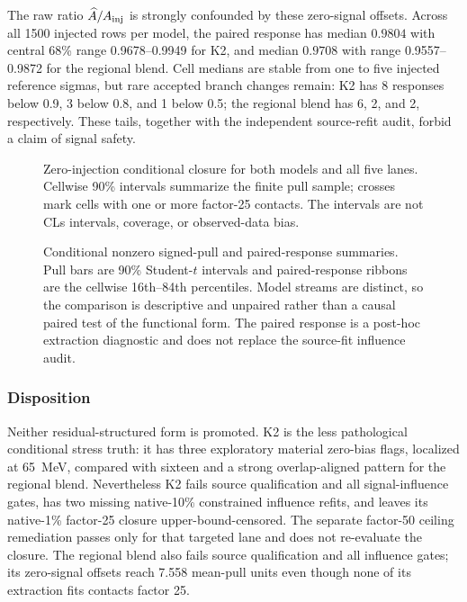 The raw ratio $\widehat A/A_{\rm inj}$ is strongly confounded by these
zero-signal offsets.  Across all 1500 injected rows per model, the paired
response has median $0.9804$ with central 68\% range 0.9678--0.9949 for K2,
and median $0.9708$ with range 0.9557--0.9872 for the regional blend.  Cell
medians are stable from one to five injected reference sigmas, but rare
accepted branch changes remain: K2 has 8 responses below 0.9, 3 below 0.8,
and 1 below 0.5; the regional blend has 6, 2, and 2, respectively.  These
tails, together with the independent source-refit audit, forbid a claim of
signal safety.

\begin{figure}[htbp]
\centering
{}
\caption{Zero-injection conditional
closure for both models and all five lanes.  Cellwise 90\% intervals summarize
the finite pull sample; crosses mark cells with one or more factor-25 contacts.
The intervals are not CLs intervals, coverage, or observed-data bias.}
\label{fig:v4p8p3-zero-signal-closure}
\end{figure}

\begin{figure}[htbp]
\centering
{}
\caption{Conditional nonzero signed-pull and paired-response summaries.
Pull bars are 90\% Student-$t$ intervals and paired-response ribbons are the
cellwise 16th--84th percentiles.  Model streams are distinct, so the
comparison is descriptive and unpaired rather than a causal paired test of the
functional form.  The paired response is a post-hoc extraction diagnostic and
does not replace the source-fit influence audit.}
\label{fig:v4p8p3-injected-recovery}
\end{figure}

\subsubsection{Disposition}

Neither residual-structured form is promoted.  K2 is the less pathological
conditional stress truth: it has three exploratory material zero-bias flags,
localized at 65~MeV, compared with sixteen and a strong overlap-aligned pattern
for the regional blend.  Nevertheless K2 fails source qualification and all
signal-influence gates, has two missing native-10\% constrained influence
refits, and leaves its native-1\% factor-25 closure upper-bound-censored.  The
separate factor-50 ceiling remediation passes only for that targeted lane and
does not re-evaluate the closure.  The regional blend also fails source
qualification and all influence gates; its zero-signal
offsets reach 7.558 mean-pull units even though none of its extraction fits
contacts factor 25.

